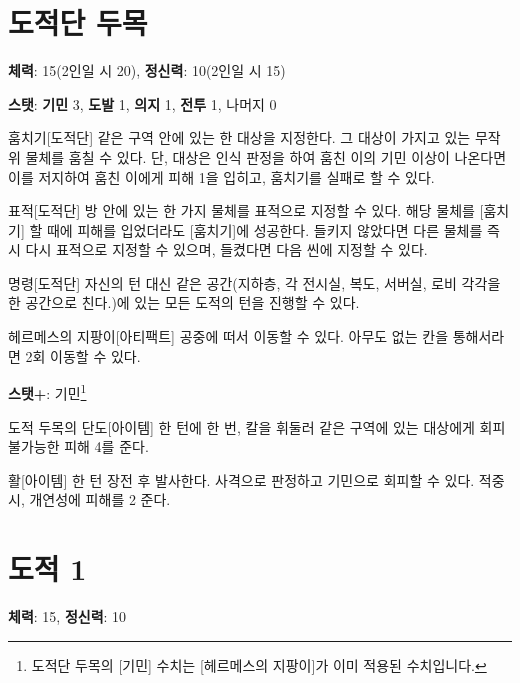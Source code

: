 \documentclass{report}
\begin{document}
	\section*{도적단 두목}
	\textbf{체력}: 15(2인일 시 20), \textbf{정신력}: 10(2인일 시 15)
	
	\textbf{스탯}: \textbf{기민} 3, \textbf{도발} 1, \textbf{의지} 1, \textbf{전투} 1, 나머지 0
	
	\begin{spoiler}{훔치기}{[도적단]}
		같은 구역 안에 있는 한 대상을 지정한다. 그 대상이 가지고 있는 무작위 물체를 훔칠 수 있다. 단, 대상은 인식 판정을 하여 훔친 이의 기민 이상이 나온다면 이를 저지하여 훔친 이에게 피해 1을 입히고, 훔치기를 실패로 할 수 있다.
	\end{spoiler}
	
	\begin{spoiler}{표적}{[도적단]}
		방 안에 있는 한 가지 물체를 표적으로 지정할 수 있다. 해당 물체를 [훔치기] 할 때에 피해를 입었더라도 [훔치기]에 성공한다. 들키지 않았다면 다른 물체를 즉시 다시 표적으로 지정할 수 있으며, 들켰다면 다음 씬에 지정할 수 있다.
	\end{spoiler}
	
	\begin{spoiler}{명령}{[도적단]}
		자신의 턴 대신 같은 공간(지하층, 각 전시실, 복도, 서버실, 로비 각각을 한 공간으로 친다.)에 있는 모든 도적의 턴을 진행할 수 있다.
	\end{spoiler}
	
	\begin{spoiler}{헤르메스의 지팡이}{[아티팩트]}
		공중에 떠서 이동할 수 있다. 아무도 없는 칸을 통해서라면 2회 이동할 수 있다.
		
		\textbf{스탯+}: 기민\footnote{도적단 두목의 [기민] 수치는 [헤르메스의 지팡이]가 이미 적용된 수치입니다.}
	\end{spoiler}
	
	\begin{spoiler}{도적 두목의 단도}{[아이템]}
		한 턴에 한 번, 칼을 휘둘러 같은 구역에 있는 대상에게 회피 불가능한 피해 4를 준다.
	\end{spoiler}
	
	\begin{spoiler}{활}{[아이템]}
		한 턴 장전 후 발사한다. 사격으로 판정하고 기민으로 회피할 수 있다. 적중시, 개연성에 피해를 2 준다.
	\end{spoiler}
	
	\section*{도적 1}
	\textbf{체력}: 15, \textbf{정신력}: 10
	
\end{document}
